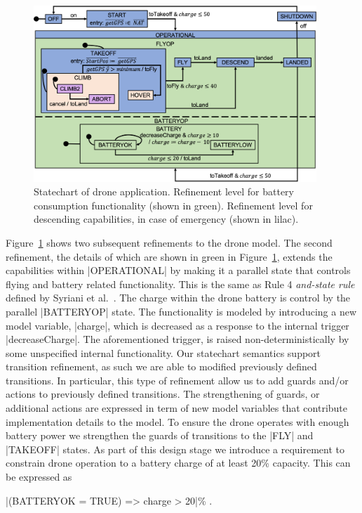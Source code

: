 \begin{figure}[!h]
	\centering
	\includegraphics[width=0.95\textwidth]{figures/Picture5.png}
	\caption{Statechart of drone application. 
	Refinement level for battery consumption functionality (shown in green).
	Refinement level for descending capabilities, in case of emergency (shown in lilac).}
	\label{fig:drone4}
\end{figure} 

Figure~\ref{fig:drone4} shows two subsequent refinements to the drone model.
The second refinement, the details of which are shown in green in Figure~\ref{fig:drone4}, 
extends the capabilities within |OPERATIONAL| by making it a parallel
state that controls flying and battery related functionality. 
This is the same as Rule 4 \emph{and-state rule} defined by Syriani et al.~\cite{Syriani_2019}.
The charge within the drone battery is control by the parallel |BATTERYOP| state. 
The functionality is modeled by introducing a new model variable, |charge|, which is decreased as 
a response to the internal trigger |decreaseCharge|. The aforementioned trigger, is raised non-deterministically by some 
unspecified internal functionality. Our statechart semantics support transition refinement, as such
we are able to modified previously defined transitions. In particular, this type of refinement allow
us to add guards and/or actions to previously defined transitions. The strengthening of guards, or additional 
actions are expressed in term of new model variables that contribute implementation details to the model.
To ensure the drone operates with enough battery power we strengthen the guards of transitions 
to the |FLY| and |TAKEOFF| states.
As part of this design stage we introduce a requirement to constrain drone operation 
to a battery charge of at least 20\% capacity. This can be expressed as
\begin{center}
  |(BATTERYOK = TRUE) => charge > 20|\% .
\end{center}

